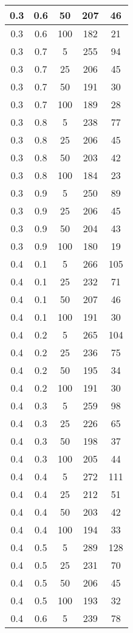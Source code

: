 \begin{appendices}
\begin{center}
\begin{longtable}[c]{|c|c|c|c|c|}
		\hline
		0.3& 0.6& 50& 207&  46\\
		\hline
		0.3& 0.6& 100& 182&  21\\
		\hline
		0.3& 0.7& 5& 255&  94\\
		\hline
		0.3& 0.7& 25& 206&  45\\
		\hline
		0.3& 0.7& 50& 191&  30\\
		\hline
		0.3& 0.7& 100& 189&  28\\
		\hline
		0.3& 0.8& 5& 238&  77\\
		\hline
		0.3& 0.8& 25& 206&  45\\
		\hline
		0.3& 0.8& 50& 203&  42\\
		\hline
		0.3& 0.8& 100& 184&  23\\
		\hline
		0.3& 0.9& 5& 250&  89\\
		\hline
		0.3& 0.9& 25& 206&  45\\
		\hline
		0.3& 0.9& 50& 204&  43\\
		\hline
		0.3& 0.9& 100& 180&  19\\
		\hline
		0.4& 0.1& 5& 266&  105\\
		\hline
		0.4& 0.1& 25& 232&  71\\
		\hline
		0.4& 0.1& 50& 207&  46\\
		\hline
		0.4& 0.1& 100& 191&  30\\
		\hline
		0.4& 0.2& 5& 265&  104\\
		\hline
		0.4& 0.2& 25& 236&  75\\
		\hline
		0.4& 0.2& 50& 195&  34\\
		\hline
		0.4& 0.2& 100& 191&  30\\
		\hline
		0.4& 0.3& 5& 259&  98\\
		\hline
		0.4& 0.3& 25& 226&  65\\
		\hline
		0.4& 0.3& 50& 198&  37\\
		\hline
		0.4& 0.3& 100& 205&  44\\
		\hline
		0.4& 0.4& 5& 272&  111\\
		\hline
		0.4& 0.4& 25& 212&  51\\
		\hline
		0.4& 0.4& 50& 203&  42\\
		\hline
		0.4& 0.4& 100& 194&  33\\
		\hline
		0.4& 0.5& 5& 289&  128\\
		\hline
		0.4& 0.5& 25& 231&  70\\
		\hline
		0.4& 0.5& 50& 206&  45\\
		\hline
		0.4& 0.5& 100& 193&  32\\
		\hline
		0.4& 0.6& 5& 239&  78\\

\end{longtable}
\end{center}
\end{appendices}
